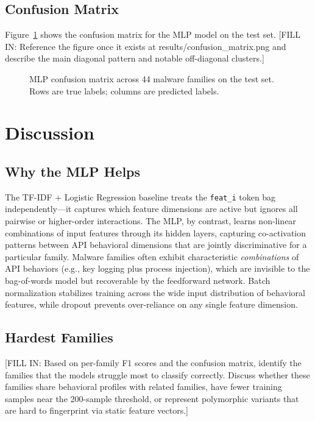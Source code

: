 \documentclass[11pt]{article}
\begin{document}
\subsection{Confusion Matrix}

Figure~\ref{fig:cm} shows the confusion matrix for the MLP model
on the test set. [FILL IN: Reference the figure once it exists at
results/confusion\_matrix.png and describe the main diagonal pattern
and notable off-diagonal clusters.]

\begin{figure}[h]
\centering
\caption{MLP confusion matrix across 44 malware families on the
         test set. Rows are true labels; columns are predicted labels.}
\label{fig:cm}
\end{figure}

\section{Discussion}
\label{sec:discussion}

\subsection{Why the MLP Helps}

The TF-IDF + Logistic Regression baseline treats the \texttt{feat\_i}
token bag independently—it captures which feature dimensions are active
but ignores all pairwise or higher-order interactions. The MLP, by
contrast, learns non-linear combinations of input features through its
hidden layers, capturing co-activation patterns between API behavioral
dimensions that are jointly discriminative for a particular family.
Malware families often exhibit characteristic \emph{combinations} of API
behaviors (e.g., key logging plus process injection), which are invisible
to the bag-of-words model but recoverable by the feedforward network.
Batch normalization stabilizes training across the wide input distribution
of behavioral features, while dropout prevents over-reliance on any single
feature dimension.

\subsection{Hardest Families}

[FILL IN: Based on per-family F1 scores and the confusion matrix,
identify the families that the models struggle most to classify correctly.
Discuss whether these families share behavioral profiles with related
families, have fewer training samples near the 200-sample threshold,
or represent polymorphic variants that are hard to fingerprint via
static feature vectors.]
\end{document}
